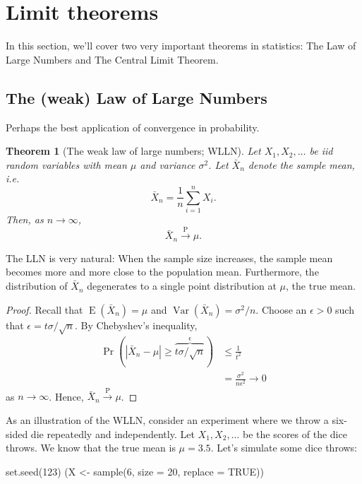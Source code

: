 \documentclass[
]{book}
\newenvironment{Shaded}{\begin{snugshade}}{\end{snugshade}}
\newcommand{\AttributeTok}[1]{\textcolor[rgb]{0.77,0.63,0.00}{#1}}
\newcommand{\ConstantTok}[1]{\textcolor[rgb]{0.00,0.00,0.00}{#1}}
\newcommand{\DecValTok}[1]{\textcolor[rgb]{0.00,0.00,0.81}{#1}}
\newcommand{\FunctionTok}[1]{\textcolor[rgb]{0.00,0.00,0.00}{#1}}
\newcommand{\NormalTok}[1]{#1}
\newcommand{\OtherTok}[1]{\textcolor[rgb]{0.56,0.35,0.01}{#1}}
\DeclareMathOperator{\E}{E}
\DeclareMathOperator{\Var}{Var}
\newtheorem{theorem}{Theorem}[chapter]
\theoremstyle{definition}
\theoremstyle{definition}
\theoremstyle{definition}
\theoremstyle{definition}
\theoremstyle{remark}
\begin{document}
\hypertarget{limit-theorems}{%
\section{Limit theorems}\label{limit-theorems}}

In this section, we'll cover two very important theorems in statistics: The Law of Large Numbers and The Central Limit Theorem.

\hypertarget{the-weak-law-of-large-numbers}{%
\subsection{The (weak) Law of Large Numbers}\label{the-weak-law-of-large-numbers}}

Perhaps the best application of convergence in probability.

\begin{theorem}[The weak law of large numbers; WLLN]
Let \(X_1,X_2,\dots\) be iid random variables with mean \(\mu\) and variance \(\sigma^2\).
Let \(\bar X_n\) denote the sample mean, i.e.~\[\bar X_n = \frac{1}{n}\sum_{i=1}^n X_i.\]
Then, as \(n\to\infty\),
\[\bar X_n{\xrightarrow{\text{P}}} \mu.\]
\end{theorem}

The LLN is very natural: When the sample size increases, the sample mean
becomes more and more close to the population mean. Furthermore, the
distribution of \(\bar X_n\) degenerates to a single point distribution at \(\mu\), the true mean.

\begin{proof}
Recall that \(\E(\bar X_n)=\mu\) and \(\Var(\bar X_n) = \sigma^2/n\).
Choose an \(\epsilon >0\) such that \(\epsilon=t\sigma/\sqrt{n}\).
By Chebyshev's inequality,
\begin{align*}
\Pr(|\bar X_n - \mu| \geq \overbrace{t\sigma/\sqrt{n}}^{\epsilon}) 
&\leq \frac{1}{t^2}\\
&=\frac{\sigma^2}{n\epsilon^2} \to 0
\end{align*}
as \(n\to\infty\).
Hence, \(\bar X_n{\xrightarrow{\text{P}}} \mu\).
\end{proof}

As an illustration of the WLLN, consider an experiment where we throw a six-sided die repeatedly and independently.
Let \(X_1,X_2,\dots\) be the scores of the dice throws.
We know that the true mean is \(\mu=3.5\).
Let's simulate some dice throws:

\begin{Shaded}
\begin{Highlighting}[]
\FunctionTok{set.seed}\NormalTok{(}\DecValTok{123}\NormalTok{)}
\NormalTok{(X }\OtherTok{\textless{}{-}} \FunctionTok{sample}\NormalTok{(}\DecValTok{6}\NormalTok{, }\AttributeTok{size =} \DecValTok{20}\NormalTok{, }\AttributeTok{replace =} \ConstantTok{TRUE}\NormalTok{))}
\end{Highlighting}
\end{Shaded}
\end{document}
